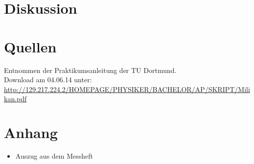 \documentclass[11pt,ngerman,a4paper]{article}
\begin{document}
\section{Diskussion}

\section{Quellen}
\begin{enumerate}[{[}1{]}]
\item Entnommen der Praktikumsanleitung \textit{} der TU Dortmund. \\
Download am 04.06.14 unter:\\
 \url{http://129.217.224.2/HOMEPAGE/PHYSIKER/BACHELOR/AP/SKRIPT/Milikan.pdf}
\end{enumerate}
\section{Anhang}
\begin{itemize}
\item Auszug aus dem Messheft
\end{itemize}
\end{document}
